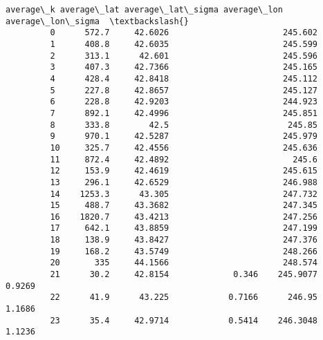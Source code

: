 \documentclass{article}
\begin{document}
\begin{Verbatim}[commandchars=\\\{\}]
            average\_k average\_lat average\_lat\_sigma average\_lon average\_lon\_sigma  \textbackslash{}
         0      572.7     42.6026                       245.602                     
         1      408.8     42.6035                       245.599                     
         2      313.1      42.601                       245.596                     
         3      407.3     42.7366                       245.165                     
         4      428.4     42.8418                       245.112                     
         5      227.8     42.8657                       245.127                     
         6      228.8     42.9203                       244.923                     
         7      892.1     42.4996                       245.851                     
         8      333.8        42.5                        245.85                     
         9      970.1     42.5287                       245.979                     
         10     325.7     42.4556                       245.636                     
         11     872.4     42.4892                         245.6                     
         12     153.9     42.4619                       245.615                     
         13     296.1     42.6529                       246.988                     
         14    1253.3      43.305                       247.732                     
         15     488.7     43.3682                       247.345                     
         16    1820.7     43.4213                       247.256                     
         17     642.1     43.8859                       247.199                     
         18     138.9     43.8427                       247.376                     
         19     168.2     43.5749                       248.266                     
         20       335     44.1566                       248.574                     
         21      30.2     42.8154             0.346    245.9077            0.9269   
         22      41.9      43.225            0.7166      246.95            1.1686   
         23      35.4     42.9714            0.5414    246.3048            1.1236   
         

\end{Verbatim}
\end{document}

